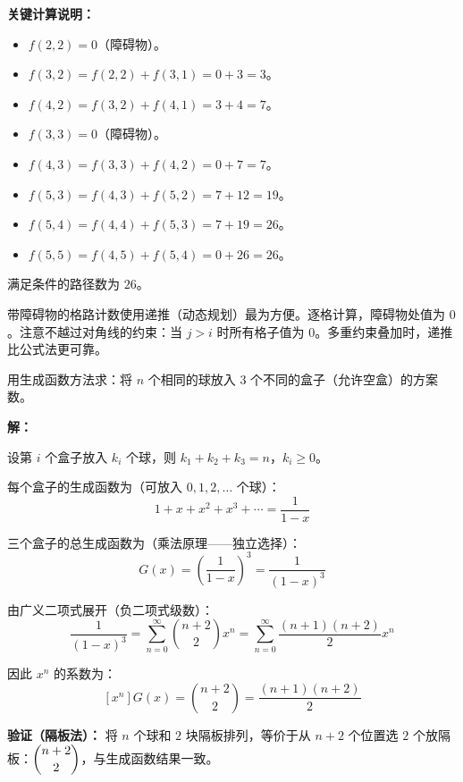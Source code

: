 \documentclass[12pt, a4paper]{ctexart}
\begin{document}
\textbf{关键计算说明：}
\begin{itemize}[leftmargin=1.5em]
  \item \(f(2,2)=0\)（障碍物）。
  \item \(f(3,2) = f(2,2)+f(3,1) = 0+3 = 3\)。
  \item \(f(4,2) = f(3,2)+f(4,1) = 3+4 = 7\)。
  \item \(f(3,3)=0\)（障碍物）。
  \item \(f(4,3) = f(3,3)+f(4,2) = 0+7 = 7\)。
  \item \(f(5,3) = f(4,3)+f(5,2) = 7+12 = 19\)。
  \item \(f(5,4) = f(4,4)+f(5,3) = 7+19 = 26\)。
  \item \(f(5,5) = f(4,5)+f(5,4) = 0+26 = 26\)。
\end{itemize}

满足条件的路径数为 \(\boxed{26}\)。

\begin{tipbox}[方法总结]
带障碍物的格路计数使用递推（动态规划）最为方便。逐格计算，障碍物处值为 \(0\)。注意不越过对角线的约束：当 \(j>i\) 时所有格子值为 \(0\)。多重约束叠加时，递推比公式法更可靠。
\end{tipbox}

\vspace{6pt}

\begin{examplebox}
用生成函数方法求：将 \(n\) 个相同的球放入 \(3\) 个不同的盒子（允许空盒）的方案数。
\end{examplebox}

\textbf{解：}

设第 \(i\) 个盒子放入 \(k_i\) 个球，则 \(k_1+k_2+k_3 = n\)，\(k_i \ge 0\)。

每个盒子的生成函数为（可放入 \(0,1,2,\ldots\) 个球）：
\[
1 + x + x^2 + x^3 + \cdots = \frac{1}{1-x}
\]

三个盒子的总生成函数为（乘法原理——独立选择）：
\[
G(x) = \left(\frac{1}{1-x}\right)^3 = \frac{1}{(1-x)^3}
\]

由广义二项式展开（负二项式级数）：
\[
\frac{1}{(1-x)^3} = \sum_{n=0}^{\infty} \binom{n+2}{2} x^n = \sum_{n=0}^{\infty} \frac{(n+1)(n+2)}{2} x^n
\]

因此 \(x^n\) 的系数为：
\[
[x^n]G(x) = \binom{n+2}{2} = \frac{(n+1)(n+2)}{2}
\]

\textbf{验证（隔板法）：} 将 \(n\) 个球和 \(2\) 块隔板排列，等价于从 \(n+2\) 个位置选 \(2\) 个放隔板：\(\dbinom{n+2}{2}\)，与生成函数结果一致。
\end{document}
